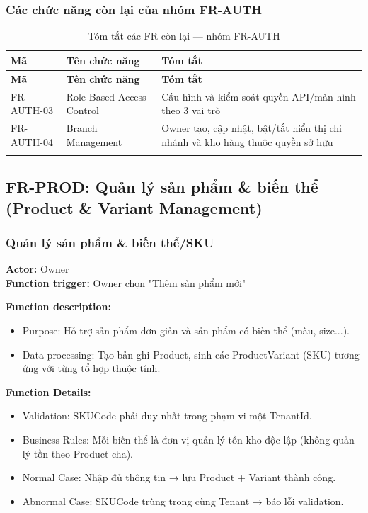 \subsubsection{Các chức năng còn lại của nhóm FR-AUTH}

\begin{longtable}{|p{2cm}|p{4.5cm}|p{7cm}|}
    \hline
    \textbf{Mã} & \textbf{Tên chức năng} & \textbf{Tóm tắt} \\
    \hline
    \endfirsthead
    \hline
    \textbf{Mã} & \textbf{Tên chức năng} & \textbf{Tóm tắt} \\
    \hline
    \endhead
    FR-AUTH-03 & Role-Based Access Control & Cấu hình và kiểm soát quyền API/màn hình theo 3 vai trò \\
    \hline
    FR-AUTH-04 & Branch Management & Owner tạo, cập nhật, bật/tắt hiển thị chi nhánh và kho hàng thuộc quyền sở hữu \\
    \hline
    \caption{Tóm tắt các FR còn lại — nhóm FR-AUTH}
\end{longtable}

\subsection{FR-PROD: Quản lý sản phẩm \& biến thể (Product \& Variant Management)}

\subsubsection{Quản lý sản phẩm \& biến thể/SKU}
\textbf{Actor:} Owner \\
\textbf{Function trigger:} Owner chọn "Thêm sản phẩm mới"

\textbf{Function description:}
\begin{itemize}
    \item Purpose: Hỗ trợ sản phẩm đơn giản và sản phẩm có biến thể (màu, size...).
    \item Data processing: Tạo bản ghi Product, sinh các ProductVariant (SKU) tương ứng với từng tổ hợp thuộc tính.
\end{itemize}

\textbf{Function Details:}
\begin{itemize}
    \item Validation: SKUCode phải duy nhất trong phạm vi một TenantId.
    \item Business Rules: Mỗi biến thể là đơn vị quản lý tồn kho độc lập (không quản lý tồn theo Product cha).
    \item Normal Case: Nhập đủ thông tin → lưu Product + Variant thành công.
    \item Abnormal Case: SKUCode trùng trong cùng Tenant → báo lỗi validation.
\end{itemize}

